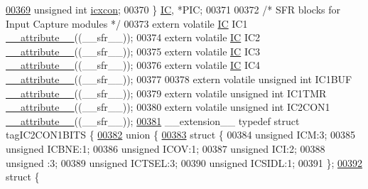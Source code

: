 \begin{DoxyCode}
\hypertarget{a00015_source_l00369}{}\hyperlink{a00014_a5fdcc8582f85c71d97c3f0231cbad23f}{00369}         \textcolor{keywordtype}{unsigned} \textcolor{keywordtype}{int} \hyperlink{a00014_a5fdcc8582f85c71d97c3f0231cbad23f}{icxcon};
00370 \} \hyperlink{a00014_db/db1/a00460}{IC}, *PIC;
00371 
00372 \textcolor{comment}{/* SFR blocks for Input Capture modules */}
00373 \textcolor{keyword}{extern} \textcolor{keyword}{volatile} \hyperlink{a00014_db/db1/a00460}{IC} IC1 \hyperlink{a00015_a493c46f03454991ccc5aa7a6e1dfb2a7}{\_\_attribute\_\_}((\_\_sfr\_\_));
00374 \textcolor{keyword}{extern} \textcolor{keyword}{volatile} \hyperlink{a00014_db/db1/a00460}{IC} IC2 \hyperlink{a00015_a493c46f03454991ccc5aa7a6e1dfb2a7}{\_\_attribute\_\_}((\_\_sfr\_\_));
00375 \textcolor{keyword}{extern} \textcolor{keyword}{volatile} \hyperlink{a00014_db/db1/a00460}{IC} IC3 \hyperlink{a00015_a493c46f03454991ccc5aa7a6e1dfb2a7}{\_\_attribute\_\_}((\_\_sfr\_\_));
00376 \textcolor{keyword}{extern} \textcolor{keyword}{volatile} \hyperlink{a00014_db/db1/a00460}{IC} IC4 \hyperlink{a00015_a493c46f03454991ccc5aa7a6e1dfb2a7}{\_\_attribute\_\_}((\_\_sfr\_\_));
00377 
00378 \textcolor{keyword}{extern} \textcolor{keyword}{volatile} \textcolor{keywordtype}{unsigned} \textcolor{keywordtype}{int}  IC1BUF \hyperlink{a00015_a493c46f03454991ccc5aa7a6e1dfb2a7}{\_\_attribute\_\_}((\_\_sfr\_\_));
00379 \textcolor{keyword}{extern} \textcolor{keyword}{volatile} \textcolor{keywordtype}{unsigned} \textcolor{keywordtype}{int}  IC1TMR \hyperlink{a00015_a493c46f03454991ccc5aa7a6e1dfb2a7}{\_\_attribute\_\_}((\_\_sfr\_\_));
00380 \textcolor{keyword}{extern} \textcolor{keyword}{volatile} \textcolor{keywordtype}{unsigned} \textcolor{keywordtype}{int}  IC2CON1 \hyperlink{a00015_a493c46f03454991ccc5aa7a6e1dfb2a7}{\_\_attribute\_\_}((\_\_sfr\_\_));
\hypertarget{a00015_source_l00381}{}\hyperlink{a00014}{00381} \_\_extension\_\_ \textcolor{keyword}{typedef} \textcolor{keyword}{struct }tagIC2CON1BITS \{
\hypertarget{a00015_source_l00382}{}\hyperlink{a00015}{00382}   \textcolor{keyword}{union }\{
\hypertarget{a00015_source_l00383}{}\hyperlink{a00015}{00383}     \textcolor{keyword}{struct }\{
00384       \textcolor{keywordtype}{unsigned} ICM:3;
00385       \textcolor{keywordtype}{unsigned} ICBNE:1;
00386       \textcolor{keywordtype}{unsigned} ICOV:1;
00387       \textcolor{keywordtype}{unsigned} ICI:2;
00388       \textcolor{keywordtype}{unsigned} :3;
00389       \textcolor{keywordtype}{unsigned} ICTSEL:3;
00390       \textcolor{keywordtype}{unsigned} ICSIDL:1;
00391     \};
\hypertarget{a00015_source_l00392}{}\hyperlink{a00015}{00392}     \textcolor{keyword}{struct }\{

\end{DoxyCode}
